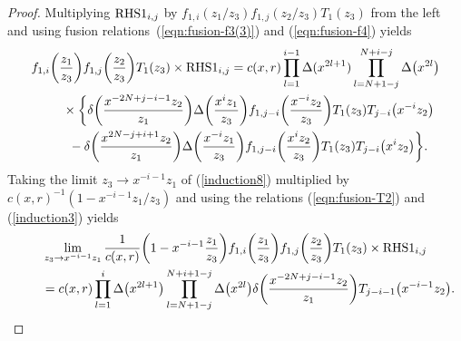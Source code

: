 \documentclass[10pt,a4paper]{amsart}
\numberwithin{equation}{section}
\begin{document}
\begin{proof}
{\sloppy Multiplying ${\rm RHS1}_{i,j}$ by $f_{1,i}(z_1/z_3)f_{1,j}(z_2/z_3)T_1(z_3)$ from the left and using fusion re\-la\-tions~(\ref{eqn:fusion-f3(3)}) and (\ref{eqn:fusion-f4}) yields
\begin{gather}
f_{1,i}\bigg(\frac{z_1}{z_3}\bigg)f_{1,j}\bigg(\frac{z_2}{z_3}\bigg)T_1(z_3)
\times {\rm RHS1}_{i, j}=
c(x,r)\prod_{l=1}^{i-1}\Delta(x^{2l+1})\prod_{l=N+1-j}^{N+i-j}\Delta\big(x^{2l}\big)\notag
\\ \qquad
{}\times
\bigg\{\delta\bigg(\frac{x^{-2N+j-i-1}z_2}{z_1}\bigg)
\Delta\bigg(\frac{x^i z_1}{z_3}\bigg)f_{1,j-i}\bigg(\frac{x^{-i}z_2}{z_3}\bigg) T_1(z_3)T_{j-i}\big(x^{-i}z_2\big)\notag
\\ \qquad
{}-\delta\bigg(\frac{x^{2N-j+i+1}z_2}{z_1}\bigg)
\Delta\bigg(\frac{x^{-i} z_1}{z_3}\bigg)
f_{1,j-i}\bigg(\frac{x^{i}z_2}{z_3}\bigg)T_1(z_3)T_{j-i}\big(x^{i}z_2\big)\bigg\}.
\label{induction8}
\end{gather}}%
Taking the limit $z_3\to x^{-i-1}z_1$ of (\ref{induction8}) multiplied by $c(x,r)^{-1} (1-x^{-i-1}z_1/z_3)$ and using the relations
(\ref{eqn:fusion-T2}) and (\ref{induction3}) yields
\begin{gather}
\lim_{z_3 \to x^{-i-1}z_1}\frac{1}{c(x,r)}\bigg(1-x^{-i-1}\frac{z_1}{z_3}\bigg)
f_{1,i}\bigg(\frac{z_1}{z_3}\bigg)
f_{1,j}\bigg(\frac{z_2}{z_3}\bigg)T_1(z_3)\times {\rm RHS1}_{i, j}\notag
\\ \qquad
{}=c(x,r)\prod_{l=1}^i \Delta\big(x^{2l+1}\big)
\prod_{l=N+1-j}^{N+i+1-j}\Delta\big(x^{2l}\big)
\delta\bigg(\frac{x^{-2N+j-i-1}z_2}{z_1}\bigg)T_{j-i-1}\big(x^{-i-1}z_2\big).
\label{induction9}
\end{gather}


\end{proof}
\end{document}
